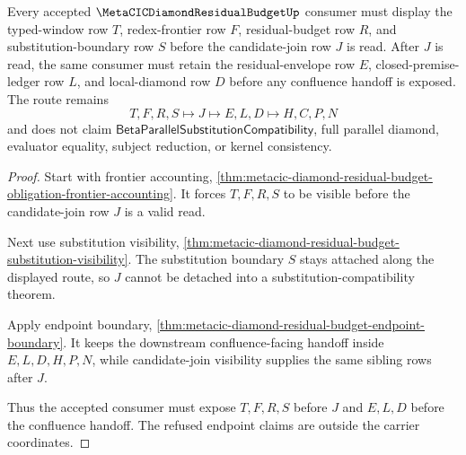 \begin{theorem}
\label{thm:metacic-diamond-residual-budget-obligations}
Every accepted $\MetaCICDiamondResidualBudgetUp$ consumer must display the typed-window row $T$, redex-frontier row $F$, residual-budget row $R$, and substitution-boundary row $S$ before the candidate-join row $J$ is read. After $J$ is read, the same consumer must retain the residual-envelope row $E$, closed-premise-ledger row $L$, and local-diamond row $D$ before any confluence handoff is exposed. The route remains
$$
T,F,R,S \longmapsto J \longmapsto E,L,D \longmapsto H,C,P,N
$$
and does not claim $\mathsf{BetaParallelSubstitutionCompatibility}$, full parallel diamond, evaluator equality, subject reduction, or kernel consistency.
\end{theorem}
\begin{proof}
Start with frontier accounting, \autoref{thm:metacic-diamond-residual-budget-obligation-frontier-accounting}. It forces $T,F,R,S$ to be visible before the candidate-join row $J$ is a valid read.

Next use substitution visibility, \autoref{thm:metacic-diamond-residual-budget-substitution-visibility}. The substitution boundary $S$ stays attached along the displayed route, so $J$ cannot be detached into a substitution-compatibility theorem.

Apply endpoint boundary, \autoref{thm:metacic-diamond-residual-budget-endpoint-boundary}. It keeps the downstream confluence-facing handoff inside $E,L,D,H,P,N$, while candidate-join visibility supplies the same sibling rows after $J$.

Thus the accepted consumer must expose $T,F,R,S$ before $J$ and $E,L,D$ before the confluence handoff. The refused endpoint claims are outside the carrier coordinates.
\end{proof}

